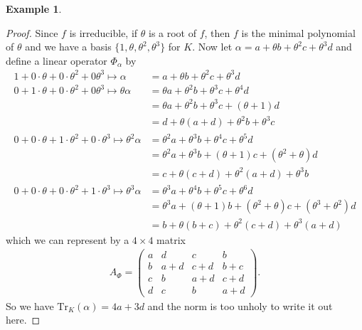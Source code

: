 \documentclass[a4paper]{book}
\theoremstyle{definition}
\newtheorem{example}{Example}[definition]
\begin{document}
\begin{example}
\begin{enumerate}
\begin{proof}
            Since \(f\) is irreducible, if \(\theta\) is a root of \(f\), then \(f\) is the minimal polynomial of \(\theta\) and we have a basis \(\{1, \theta, \theta^2, \theta^3\}\) for \(K\). Now let \(\alpha = a + \theta b + \theta^2 c + \theta^3 d\) and define a linear operator \(\Phi_\alpha\) by
            \begin{align*}
                1 + 0 \cdot \theta + 0 \cdot \theta^2 + 0 \theta^3 \mapsto \alpha &= a + \theta b + \theta^2 c + \theta^3 d \\
                0 + 1 \cdot \theta + 0 \cdot \theta^2 + 0 \theta^3 \mapsto \theta \alpha &= \theta a + \theta^2 b + \theta^3 c + \theta^4 d \\
                &= \theta a + \theta^2 b + \theta^3 c + (\theta + 1) d \\
                &= d + \theta (a + d) + \theta^2 b + \theta^3 c \\
                0 + 0 \cdot \theta + 1 \cdot \theta^2 + 0 \cdot \theta^3 \mapsto \theta^2 \alpha &= \theta^2 a + \theta^3 b + \theta^4 c + \theta^5 d \\
                &= \theta^2 a + \theta^3 b + (\theta + 1) c + (\theta^2 + \theta) d \\
                &= c + \theta (c + d) + \theta^2 (a + d) + \theta^3 b \\
                0 + 0 \cdot \theta + 0 \cdot \theta^2 + 1 \cdot \theta^3 \mapsto \theta^3 \alpha &= \theta^3 a + \theta^4 b + \theta^5 c + \theta^6 d \\
                &= \theta^3 a + (\theta + 1) b + (\theta^2 + \theta) c + (\theta^3 + \theta^2) d \\
                &= b + \theta (b + c) + \theta^2 (c + d) + \theta^3 (a + d)
            \end{align*}
            which we can represent by a \(4 \times 4\) matrix
            \begin{align*}
                A_\Phi = \begin{pmatrix}
                    a & d & c & b \\
                    b & a + d & c + d & b + c \\
                    c & b & a + d & c + d \\
                    d & c & b & a + d
                \end{pmatrix} \text{.}
            \end{align*}
            So we have \(\mathrm{Tr}_K(\alpha) = 4a + 3d\) and the norm is too unholy to write it out here.
        \end{proof}
    \end{enumerate}
\end{example}
\end{document}
